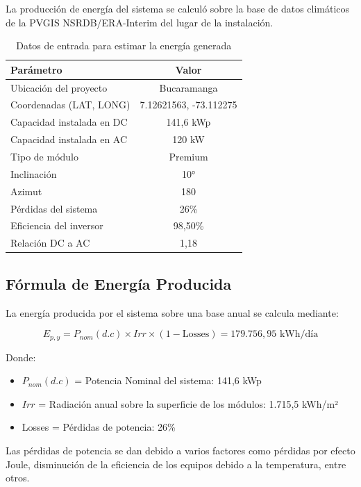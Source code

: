La producción de energía del sistema se calculó sobre la base de datos climáticos de la PVGIS NSRDB/ERA-Interim del lugar de la instalación.

\begin{table}[H]
    \centering
    \caption{Datos de entrada para estimar la energía generada}
    \begin{tabular}{lc}
    \toprule
    \textbf{Parámetro} & \textbf{Valor} \\
    \midrule
    Ubicación del proyecto & Bucaramanga \\
    Coordenadas (LAT, LONG) & 7.12621563, -73.112275 \\
    Capacidad instalada en DC & 141,6 kWp \\
    Capacidad instalada en AC & 120 kW \\
    Tipo de módulo & Premium \\
    Inclinación & 10° \\
    Azimut & 180 \\
    Pérdidas del sistema & 26\% \\
    Eficiencia del inversor & 98,50\% \\
    Relación DC a AC & 1,18 \\
    \bottomrule
    \end{tabular}
\end{table}

\subsection{Fórmula de Energía Producida}

La energía producida por el sistema sobre una base anual se calcula mediante:

\begin{equation}
E_{p,y} = P_{nom}(d.c) \times Irr \times (1 - \text{Losses}) = 179.756,95 \text{ kWh/día}
\end{equation}

Donde:
\begin{itemize}
    \item $P_{nom}(d.c)$ = Potencia Nominal del sistema: 141,6 kWp
    \item $Irr$ = Radiación anual sobre la superficie de los módulos: 1.715,5 kWh/m²
    \item Losses = Pérdidas de potencia: 26\%
\end{itemize}

Las pérdidas de potencia se dan debido a varios factores como pérdidas por efecto Joule, disminución de la eficiencia de los equipos debido a la temperatura, entre otros.

